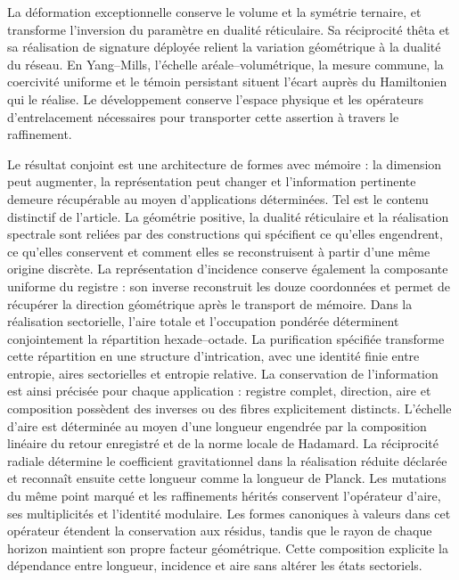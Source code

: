 La déformation exceptionnelle conserve le volume et la symétrie
ternaire, et transforme l’inversion du paramètre en dualité
réticulaire. Sa réciprocité thêta et sa réalisation de signature
déployée relient la variation géométrique à la dualité du
réseau. En Yang--Mills, l’échelle aréale--volumétrique, la mesure commune,
la coercivité uniforme et le témoin persistant situent l’écart
auprès du Hamiltonien qui le réalise. Le développement conserve
l’espace physique et les opérateurs d’entrelacement nécessaires pour transporter
cette assertion à travers le raffinement.

Le résultat conjoint est une architecture de formes avec mémoire : la dimension peut augmenter, la représentation peut changer et l'information pertinente demeure récupérable au moyen d'applications déterminées. Tel est le contenu distinctif de l'article. La géométrie positive, la dualité réticulaire et la réalisation spectrale sont reliées par des constructions qui spécifient ce qu'elles engendrent, ce qu'elles conservent et comment elles se reconstruisent à partir d'une même origine discrète.
La représentation d'incidence conserve également la composante uniforme du registre : son inverse reconstruit les douze coordonnées et permet de récupérer la direction géométrique après le transport de mémoire. Dans la réalisation sectorielle, l'aire totale et l'occupation pondérée déterminent conjointement la répartition hexade--octade. La purification spécifiée transforme cette répartition en une structure d'intrication, avec une identité finie entre entropie, aires sectorielles et entropie relative. La conservation de l'information est ainsi précisée pour chaque application : registre complet, direction, aire et composition possèdent des inverses ou des fibres explicitement distincts.
L'échelle d'aire est déterminée au moyen d'une longueur engendrée par la composition linéaire du retour enregistré et de la norme locale de Hadamard. La réciprocité radiale détermine le coefficient gravitationnel dans la réalisation réduite déclarée et reconnaît ensuite cette longueur comme la longueur de Planck. Les mutations du même point marqué et les raffinements hérités conservent l'opérateur d'aire, ses multiplicités et l'identité modulaire. Les formes canoniques à valeurs dans cet opérateur étendent la conservation aux résidus, tandis que le rayon de chaque horizon maintient son propre facteur géométrique. Cette composition explicite la dépendance entre longueur, incidence et aire sans altérer les états sectoriels.
\par\endgroup
\clearpage
